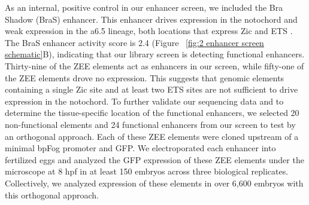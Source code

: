 As an internal, positive control in our enhancer screen, we included the Bra Shadow (BraS) enhancer. This enhancer drives expression in the notochord and weak expression in the a6.5 lineage, both locations that express Zic and ETS \cite{farley2016}. The BraS enhancer activity score is 2.4 (Figure ~\ref{fig:2 enhancer screen schematic}B), indicating that our library screen is detecting functional enhancers. Thirty-nine of the ZEE elements act as enhancers in our screen, while fifty-one of the ZEE elements drove no expression. This suggests that genomic elements containing a single Zic site and at least two ETS sites are not sufficient to drive expression in the notochord. To further validate our sequencing data and to determine the tissue-specific location of the functional enhancers, we selected 20 non-functional elements and 24 functional enhancers from our screen to test by an orthogonal approach. Each of these ZEE elements were cloned upstream of a minimal bpFog promoter and GFP. We electroporated each enhancer into fertilized eggs and analyzed the GFP expression of these ZEE elements under the microscope at 8 hpf in at least 150 embryos across three biological replicates. Collectively, we analyzed expression of these elements in over 6,600 embryos with this orthogonal approach. 

